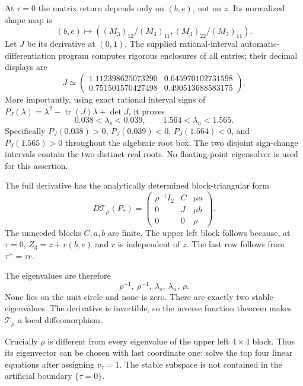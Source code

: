 At $\tau=0$ the matrix return depends only on $(b,e)$, not on $z$. Its normalized shape map is
\[
 (b,e)\longmapsto ((M_3)_{12}/(M_3)_{11},(M_3)_{22}/(M_3)_{11}).
\]
Let $J$ be its derivative at $(0,1)$. The supplied rational-interval automatic-differentiation program computes rigorous enclosures of all entries; their decimal displays are
\[
 J\simeq\begin{pmatrix}
 1.112398625073290&0.645970102731598\\
 0.751501570427498&0.490513688583175
 \end{pmatrix}.
\]
More importantly, using exact rational interval signs of
$P_J(\lambda)=\lambda^2-\operatorname{tr}(J)\lambda+\det J$, it proves
\begin{equation}\label{L:eq:eigshape}
 0.038<\lambda_s<0.039,\qquad 1.564<\lambda_u<1.565.
\end{equation}
Specifically $P_J(0.038)>0$, $P_J(0.039)<0$, $P_J(1.564)<0$, and $P_J(1.565)>0$ throughout the algebraic root box. The two disjoint sign-change intervals contain the two distinct real roots. No floating-point eigensolver is used for this assertion.

The full derivative has the analytically determined block-triangular form
\begin{equation}\label{L:eq:jacobian}
 D\mathcal T_\mu(P_*)=
 \begin{pmatrix}
 \rho^{-1}I_2&C&\mu a\\
 0&J&\mu b\\
 0&0&\rho
 \end{pmatrix}.
\end{equation}
The unneeded blocks $C,a,b$ are finite. The upper left block follows because, at $\tau=0$, $Z_3=z+v(b,e)$ and $r$ is independent of $z$. The last row follows from $\tau^+=\tau r$.

The eigenvalues are therefore
\[
 \rho^{-1},\ \rho^{-1},\ \lambda_s,\ \lambda_u,\ \rho.
\]
None lies on the unit circle and none is zero. There are exactly two stable eigenvalues. The derivative is invertible, so the inverse function theorem makes $\mathcal T_\mu$ a local diffeomorphism.

Crucially $\rho$ is different from every eigenvalue of the upper left $4\times4$ block. Thus its eigenvector can be chosen with last coordinate one: solve the top four linear equations after assigning $v_\tau=1$. The stable subspace is not contained in the artificial boundary $\{\tau=0\}$.

